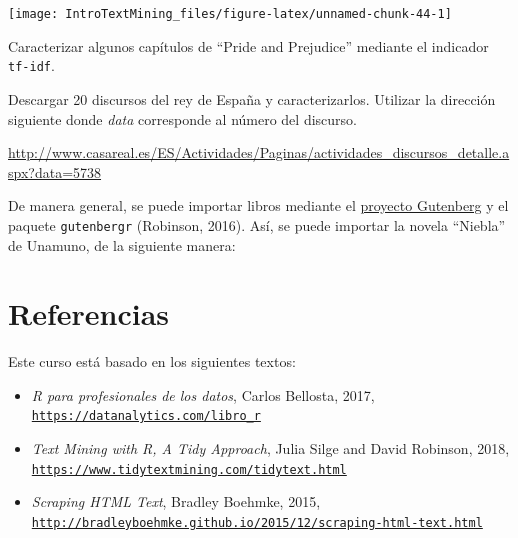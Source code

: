 \documentclass[]{article}
\newenvironment{Shaded}{\begin{snugshade}}{\end{snugshade}}
\newcommand{\KeywordTok}[1]{\textcolor[rgb]{0.13,0.29,0.53}{\textbf{#1}}}
\newcommand{\DataTypeTok}[1]{\textcolor[rgb]{0.13,0.29,0.53}{#1}}
\newcommand{\CharTok}[1]{\textcolor[rgb]{0.31,0.60,0.02}{#1}}
\newcommand{\StringTok}[1]{\textcolor[rgb]{0.31,0.60,0.02}{#1}}
\newcommand{\CommentTok}[1]{\textcolor[rgb]{0.56,0.35,0.01}{\textit{#1}}}
\newcommand{\OperatorTok}[1]{\textcolor[rgb]{0.81,0.36,0.00}{\textbf{#1}}}
\newcommand{\NormalTok}[1]{#1}
\newenvironment{ej}{\begin{Shaded}}{\end{Shaded}}
\newenvironment{nota}{\begin{Shaded}}{\end{Shaded}}
\begin{document}
\begin{center}\texttt{[image: IntroTextMining\_files/figure-latex/unnamed-chunk-44-1]} \end{center}

\begin{ej}
Caracterizar algunos capítulos de ``Pride and Prejudice'' mediante el
indicador \texttt{tf-idf}.
\end{ej}

\begin{ej}
Descargar 20 discursos del rey de España y caracterizarlos. Utilizar la
dirección siguiente donde \emph{data} corresponde al número del
discurso.

\url{http://www.casareal.es/ES/Actividades/Paginas/actividades_discursos_detalle.aspx?data=5738}
\end{ej}

\begin{nota}
De manera general, se puede importar libros mediante el
\href{!https://www.gutenberg.org/}{proyecto Gutenberg} y el paquete
\texttt{gutenbergr} (Robinson, 2016). Así, se puede importar la novela
``Niebla'' de Unamuno, de la siguiente manera:
\end{nota}

\begin{Shaded}
\end{Shaded}

\section{Referencias}\label{referencias}

Este curso está basado en los siguientes textos:

\begin{itemize}
\item
  \emph{R para profesionales de los datos}, Carlos Bellosta, 2017,
  \href{https://datanalytics.com/libro_r}{\texttt{https://datanalytics.com/libro\_r}}
\item
  \emph{Text Mining with R, A Tidy Approach}, Julia Silge and David
  Robinson, 2018,
  \href{https://www.tidytextmining.com/tidytext.html}{\texttt{https://www.tidytextmining.com/tidytext.html}}
\item
  \emph{Scraping HTML Text}, Bradley Boehmke, 2015,
  \href{http://bradleyboehmke.github.io/2015/12/scraping-html-text.html}{\texttt{http://bradleyboehmke.github.io/2015/12/scraping-html-text.html}}
\end{itemize}
\end{document}
